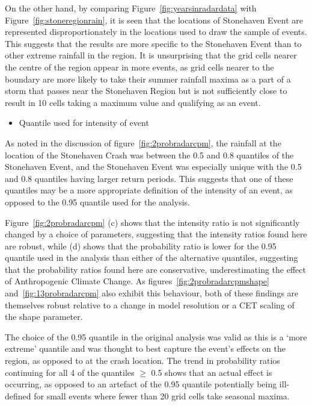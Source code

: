 On the other hand,
    by comparing Figure~\ref{fig:yearsinradardata} with Figure~\ref{fig:stoneregionrain},
    it is seen that the locations of Stonehaven Event are represented disproportionately in the
    locations used to draw the sample of events.
This suggests that the results are more specific to the Stonehaven Event than to other extreme rainfall in the region.
It is unsurprising that the grid cells nearer the centre of the region appear in more events,
    as grid cells nearer to the boundary are more likely to take their summer rainfall maxima
    as a part of a storm that passes near the Stonehaven Region but is not sufficiently close to
    result in 10 cells taking a maximum value and qualifying as an event.

\begin{itemize}\item Quantile used for intensity of event\end{itemize}

As noted in the discussion of figure~\ref{fig:2probradarcpm},
    the rainfall at the location of the Stonehaven Crash was between the 0.5 and 0.8 quantiles of the Stonehaven Event,
    and the Stonehaven Event was especially unique with the 0.5 and 0.8 quantiles having larger return periods.
This suggests that one of these quantiles may be a more appropriate definition of the intensity of an event,
    as opposed to the 0.95 quantile used for the analysis.

Figure~\ref{fig:2probradarcpm} (c) shows that the intensity ratio is not significantly changed by a choice of parameters,
    suggesting that the intensity ratios found here are robust,
    while (d) shows that the probability ratio is lower for the 0.95 quantile used in the analysis than either of the alternative quantiles,
    suggesting that the probability ratios found here are conservative,
    underestimating the effect of Anthropogenic Climate Change.
As figures~\ref{fig:2probradarcpmshape} and~\ref{fig:13probradarcpm}
    also exhibit this behaviour,
    both of these findings are themselves robust relative to a change in model resolution or a CET scaling of the shape parameter.

The choice of the 0.95 quantile in the original analysis was valid as this is a `more extreme' quantile and was thought to best capture the event's
    effects on the region, as opposed to at the crash location.
The trend in probability ratios continuing for all 4 of the quantiles $\geq$ 0.5 shows that an actual effect is occurring,
    as opposed to an artefact of the 0.95 quantile potentially being ill-defined for small events where fewer than 20 grid cells take seasonal maxima.

